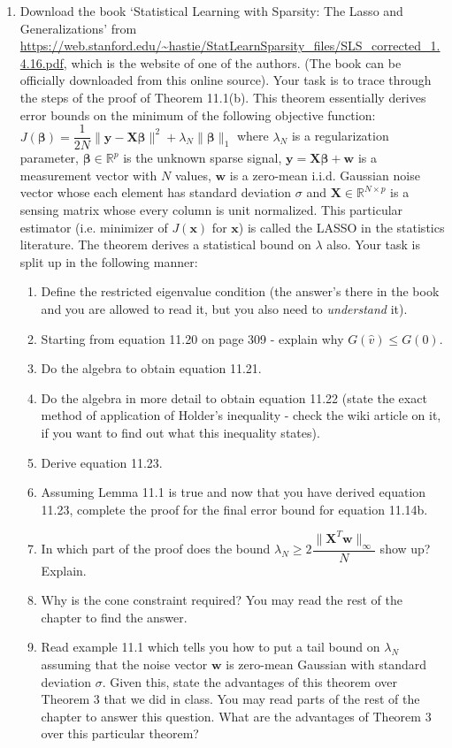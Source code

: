 \documentclass[11pt]{article}
\begin{document}
\begin{enumerate}
\item Download the book `Statistical Learning with Sparsity: The Lasso and Generalizations' from \url{https://web.stanford.edu/~hastie/StatLearnSparsity_files/SLS_corrected_1.4.16.pdf}, which is the website of one of the authors. (The book can be officially downloaded from this online source). Your task is to trace through the steps of the proof of Theorem 11.1(b). This theorem essentially derives error bounds on the minimum of the following objective function: $J(\boldsymbol{\beta}) = \dfrac{1}{2N} \|\boldsymbol{y} - \boldsymbol{X \beta}\|^2 + \lambda_N \|\boldsymbol{\beta}\|_1$ where $\lambda_N$ is a regularization parameter, $\boldsymbol{\beta} \in \mathbb{R}^p$ is the unknown sparse signal, $\boldsymbol{y} = \boldsymbol{X \beta} + \boldsymbol{w}$ is a measurement vector with $N$ values, $\boldsymbol{w}$ is a zero-mean i.i.d. Gaussian noise vector whose each element has standard deviation $\sigma$ and $\boldsymbol{X} \in \mathbb{R}^{N \times p}$ is a sensing matrix whose every column is unit normalized. This particular estimator (i.e. minimizer of $J(\boldsymbol{x})$ for $\boldsymbol{x}$) is called the LASSO in the statistics literature. The theorem derives a statistical bound on $\lambda$ also. Your task is split up in the following manner:
\begin{enumerate}
\item Define the restricted eigenvalue condition (the answer's there in the book and you are allowed to read it, but you also need to \emph{understand} it). 
\item Starting from equation 11.20 on page 309 - explain why $G(\hat{v}) \leq G(0)$.
\item Do the algebra to obtain equation 11.21.
\item Do the algebra in more detail to obtain equation 11.22 (state the exact method of application of Holder's inequality - check the wiki article on it, if you want to find out what this inequality states).
\item Derive equation 11.23.
\item Assuming Lemma 11.1 is true and now that you have derived equation 11.23, complete the proof for the final error bound for equation 11.14b.
\item In which part of the proof does the bound $\lambda_N \geq 2 \dfrac{\|\boldsymbol{X}^T \boldsymbol{w}\|_{\infty}}{N}$ show up? Explain.
\item Why is the cone constraint required? You may read the rest of the chapter to find the answer.
\item Read example 11.1 which tells you how to put a tail bound on $\lambda_N$ assuming that the noise vector $\boldsymbol{w}$ is zero-mean Gaussian with standard  deviation $\sigma$. Given this, state the advantages of this theorem over Theorem 3 that we did in class. You may read parts of the rest of the chapter to answer this question. What are the advantages of Theorem 3 over this particular theorem? 

\end{enumerate}
\end{enumerate}
\end{document}
